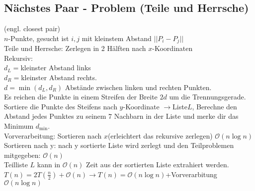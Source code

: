 \subsection{Nächstes Paar - Problem (Teile und Herrsche)}
(engl. closest pair)\\
$n$-Punkte, gesucht ist $i,j$ mit kleinstem Abstand $||P_i-P_j||$\\
Teile und Herrsche: Zerlegen in 2 Hälften nach $x$-Koordinaten\\
Rekursiv:\\
$d_L = $kleinster Abstand links\\
$d_R = $kleinster Abstand rechts.\\
$d = \min(d_L,d_R)$ Abstände zwischen linken und rechten Punkten.\\
Es reichen die Punkte in einem Streifen der Breite $2d$ um die Trennungsgerade.\\
Sortiere die Punkte des Steifens nach $y$-Koordinate $\rightarrow$Liste$L$, Berechne den Abstand jedes Punktes zu seinem $7$ Nachbarn in der Liste und merke dir das Minimum $d_{\min}$.\\
Vorverarbeitung: Sortieren nach $x$(erleichtert das rekursive zerlegen) $\mathcal{O}(n \log n)$\\
Sortieren nach y: nach y sortierte Liste wird zerlegt und den Teilproblemen mitgegeben: $\mathcal{O}(n)$\\
Teilliste $L$ kann in $\mathcal{O}(n)$ Zeit aus der sortierten Liste extrahiert werden. \\
$T(n) = 2 T(\frac{n}{2}) + \mathcal{O}(n) \rightarrow T(n) = \mathcal{O}(n \log n)$+Vorverarbitung $\mathcal{O}(n\log n)$